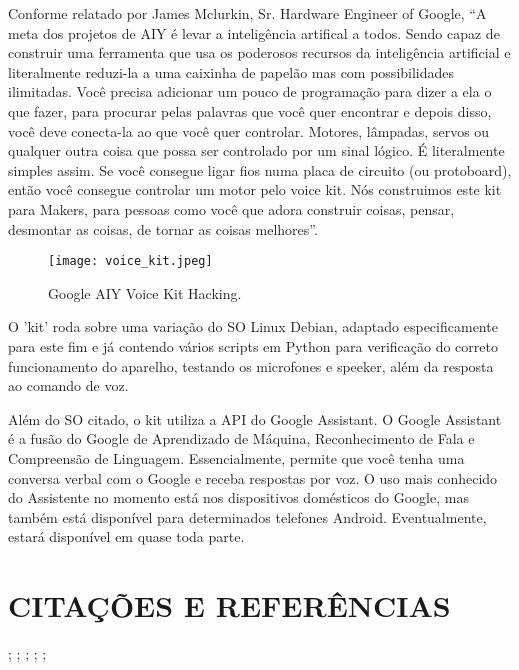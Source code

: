 \documentclass[10pt,brazil,english]{article}
\begin{document}
Conforme relatado por James Mclurkin, Sr. Hardware Engineer of Google, “A meta dos projetos de AIY é levar a inteligência artifical a todos. Sendo capaz de construir uma ferramenta que usa os poderosos recursos da inteligência artificial e literalmente reduzi-la a uma caixinha de papelão mas com possibilidades ilimitadas. Você precisa adicionar um pouco de programação para dizer a ela o que fazer, para procurar pelas palavras que você quer encontrar e depois disso, você deve conecta-la ao que você quer controlar. Motores, lâmpadas, servos ou qualquer outra coisa que possa ser controlado por um sinal lógico. É literalmente simples assim. Se você consegue ligar fios numa placa de circuito (ou protoboard), então você consegue controlar um motor pelo voice kit. Nós construimos este kit para Makers, para pessoas como você que adora construir coisas, pensar, desmontar as coisas, de tornar as coisas melhores”. 

\begin{figure}[!hbtp]
\begin{center}
\texttt{[image: voice\_kit.jpeg]}
\end{center}
\caption{Google AIY Voice Kit Hacking.}
\label{Fig1}
\end{figure}

O 'kit' roda sobre uma variação do SO Linux Debian, adaptado especificamente para este fim e já contendo vários scripts em Python para verificação do correto funcionamento do aparelho, testando os microfones e speeker, além da resposta ao comando de voz.

Além do SO citado, o kit utiliza a API do Google Assistant. O Google Assistant é a fusão do Google de Aprendizado de Máquina, Reconhecimento de Fala e Compreensão de Linguagem. Essencialmente, permite que você tenha uma conversa verbal com o Google e receba respostas por voz. O uso mais conhecido do Assistente no momento está nos dispositivos domésticos do Google, mas também está disponível para determinados telefones Android. Eventualmente, estará disponível em quase toda parte.

\section{\uppercase{Citações e referências}}


\cite{Cunha2018};
\cite{Nazario2017};
\cite{Silva2017};
\cite{Costa2017};
\cite{Ribeiro2017};




\end{document}
